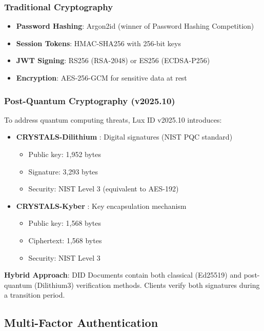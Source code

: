 \documentclass[11pt,a4paper]{article}
\begin{document}
\subsubsection{Traditional Cryptography}

\begin{itemize}
  \item \textbf{Password Hashing}: Argon2id (winner of Password Hashing Competition)
  \item \textbf{Session Tokens}: HMAC-SHA256 with 256-bit keys
  \item \textbf{JWT Signing}: RS256 (RSA-2048) or ES256 (ECDSA-P256)
  \item \textbf{Encryption}: AES-256-GCM for sensitive data at rest
\end{itemize}

\subsubsection{Post-Quantum Cryptography (v2025.10)}

To address quantum computing threats, Lux ID v2025.10 introduces:

\begin{itemize}
  \item \textbf{CRYSTALS-Dilithium} \cite{dilithium}: Digital signatures (NIST PQC standard)
    \begin{itemize}
      \item Public key: 1,952 bytes
      \item Signature: 3,293 bytes
      \item Security: NIST Level 3 (equivalent to AES-192)
    \end{itemize}
  \item \textbf{CRYSTALS-Kyber} \cite{kyber}: Key encapsulation mechanism
    \begin{itemize}
      \item Public key: 1,568 bytes
      \item Ciphertext: 1,568 bytes
      \item Security: NIST Level 3
    \end{itemize}
\end{itemize}

\textbf{Hybrid Approach}: DID Documents contain both classical (Ed25519) and post-quantum (Dilithium3) verification methods. Clients verify both signatures during a transition period.

\subsection{Multi-Factor Authentication}
\end{document}

